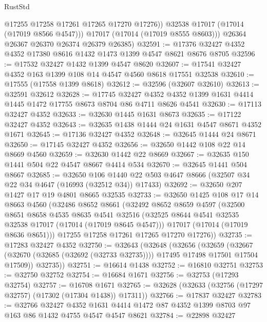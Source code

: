 \begin{lexlean}{RustStd}
\begin{coremodule}
{\begin{coremodule}
{{{{{{{{{{{{{{{{{{{{{{{{{{{{{{{{{{{{{{{{{{{{{{{{{{{{{{{              @17255
              @17258
              @17261
              @17265
              @17270
              @17276))
          @32538
          @17017
          (@17014 (@17019 @8566 @4547)))
        @17017
        (@17014 (@17019 @8555 @8603)))
      @26364
      @26367
      @26370
      @26374
      @26379
      @26385)
@32591 := @17376 @32427 @4352 @4352 @17380 @8616 @1432 @1473 @1399 @4547 @8621 @8676 @8705
@32596 := @17532 @32427 @1432 @1399 @4547 @8620
@32607 := @17541 @32427 @4352 @163 @1399 @108 @14 @4547 @4560 @8618 @17551 @32538
@32610 := @17555 (@17558 @1399 @8618)
@32612 := @32596 (@32607 @32610)
@32613 := @32591 @32612
@32628 := @17745
    @32427
    @4352
    @4352
    @1399
    @1631
    @4414
    @1445
    @1472
    @17755
    @8673
    @8704
    @86
    @4711
    @8626
    @4541
@32630 := @17113 @32427 @4352
@32633 := @32630 @1445 @1631 @8673
@32635 := @17122 @32427 @4352
@32643 := @32635 @1438 @1444 @24 @1631 @4547 @8671 @4352 @1671
@32645 := @17136 @32427 @4352
@32648 := @32645 @1444 @24 @8671
@32650 := @17145 @32427 @4352
@32656 := @32650 @1442 @108 @22 @14 @8669 @4560
@32659 := @32630 @1442 @22 @8669
@32667 := @32635 @150 @1441 @504 @22 @4547 @8667 @4414 @534
@32670 := @32645 @1441 @504 @8667
@32685 := @32650
    @106
    @1440
    @22
    @503
    @4647
    @8666
    (@32507 @34 @22 @34 @4647 (@16993 (@32512 @34)) @17433)
@32692 := @32650 @207 @1427 @17 @19 @4801 @8665 @32535
@32733 := @32650
    @1425
    @108
    @17
    @14
    @8663
    @4560
    (@32486
      @8652
      @8661
      (@32492
        @8652
        @8659
        @4597
        (@32500
          @8651
          @8658
          @4535
          @8635
          @4541
          @32516
          (@32525 @8644 @4541 @32535 @32538 @17017 (@17014 (@17019 @8645 @4547)))
          @17017
          (@17014 (@17019 @8636 @8651)))
        @17255
        @17258
        @17261
        @17265
        @17270
        @17276))
@32735 := @17283 @32427 @4352
@32750 := @32643
    (@32648
      (@32656
        (@32659
          (@32667 (@32670 (@32685 (@32692 (@32733 @32735)))) @17495 @17498 @17501 @17504 @17509))
        @32735))
@32751 := @16614 @1438
@32752 := @16810 @32751
@32753 := @32750 @32752
@32754 := @16684 @1671
@32756 := @32753 (@17293 @32754)
@32757 := @16708 @1671
@32765 := @32628 (@32633 (@32756 (@17297 @32757) (@17302 (@17304 @1438)) @17311))
@32766 := @17837 @32427
@32783 := @32766
    @32427
    @4352
    @1631
    @4414
    @1472
    @87
    @4352
    @1399
    @8703
    @97
    @163
    @86
    @1432
    @4755
    @4547
    @4547
    @8621
@32784 := @22898 @32427
}}}}}}}}}}}}}}}}}}}}}}}}}}}}}}}}}}}}}}}}}}}}}}}}}}}}}}}
\end{coremodule}}
\end{coremodule}
\end{lexlean}
